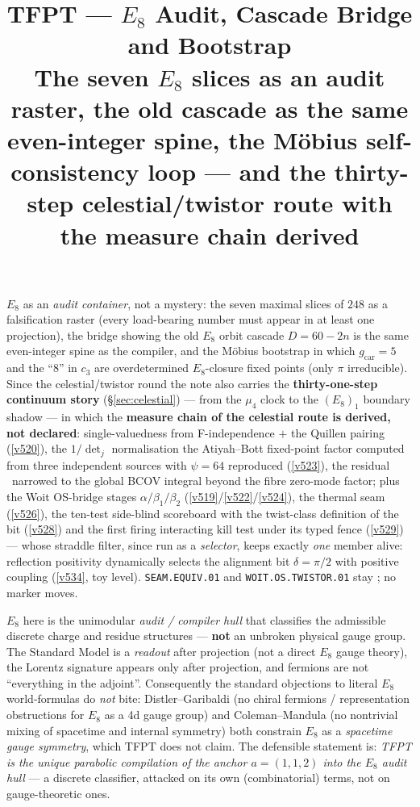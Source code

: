 \documentclass[11pt,a4paper]{article}
\title{\vspace{-1.2cm}\textbf{TFPT --- $E_8$ Audit, Cascade Bridge and Bootstrap}\\[2mm]\large The seven $E_8$ slices as an audit raster, the old cascade as the same even-integer spine, the M\"obius self-consistency loop --- and the thirty-step celestial/twistor route with the measure chain derived}
\author{\TFPTauthors}\date{\TFPTdatestamp}
\theoremstyle{definition}
\begin{document}
\maketitle
\vspace{-0.4cm}

\begin{keybox}
$E_8$ as an \emph{audit container}, not a mystery: the seven maximal slices of $248$ as a falsification
raster (every load-bearing number must appear in at least one projection), the bridge showing the old
$E_8$ orbit cascade $D{=}60{-}2n$ is the same even-integer spine as the compiler, and the M\"obius bootstrap
in which $g_{\mathrm{car}}=5$ and the ``$8$'' in $c_3$ are overdetermined $E_8$-closure fixed points (only
$\pi$ irreducible). Since the celestial/twistor round the note also carries the
\textbf{thirty-one-step continuum story} (\S\ref{sec:celestial}) --- from the $\mu_4$ clock to the
$(E_8)_1$ boundary shadow --- in which the \textbf{measure chain of the celestial route is
derived, not declared}: single-valuedness from F-independence $+$ the Quillen pairing
(\vref{v520}), the $1/\det_j$ normalisation the Atiyah--Bott fixed-point factor computed from
three independent sources with $\psi=64$ reproduced (\vref{v523}), the residual \mO\ narrowed to
the global BCOV integral beyond the fibre zero-mode factor; plus the Woit OS-bridge stages
$\alpha/\beta_1/\beta_2$ (\vref{v519}/\vref{v522}/\vref{v524}), the thermal seam
(\vref{v526}), the ten-test side-blind scoreboard with the twist-class definition of the bit
(\vref{v528}) and the first firing interacting kill test under its typed fence (\vref{v529}) ---
whose straddle filter, since run as a \emph{selector}, keeps exactly \emph{one} member alive:
reflection positivity dynamically selects the alignment bit $\delta=\pi/2$ with positive coupling
(\vref{v534}, toy level).
\texttt{SEAM.EQUIV.01} and \texttt{WOIT.OS.TWISTOR.01} stay \mO; no marker moves.
\end{keybox}

\begin{gapbox}
$E_8$ here is the unimodular \emph{audit / compiler hull} that classifies the admissible discrete charge
and residue structures --- \textbf{not} an unbroken physical gauge group. The Standard Model is a
\emph{readout} after projection (not a direct $E_8$ gauge theory), the Lorentz signature appears only
after projection, and fermions are not ``everything in the adjoint''. Consequently the standard
objections to literal $E_8$ world-formulas do \emph{not} bite: Distler--Garibaldi (no chiral fermions /
representation obstructions for $E_8$ as a 4d gauge group) and Coleman--Mandula (no nontrivial mixing of
spacetime and internal symmetry) both constrain $E_8$ as a \emph{spacetime gauge symmetry}, which TFPT
does not claim. The defensible statement is: \emph{TFPT is the unique parabolic compilation of the anchor
$a=(1,1,2)$ into the $E_8$ audit hull} --- a discrete classifier, attacked on its own (combinatorial)
terms, not on gauge-theoretic ones.
\end{gapbox}
\end{document}

